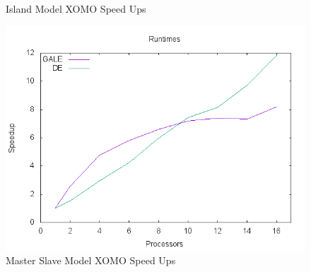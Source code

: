 \documentclass[conference]{IEEEtran}
\begin{document}
\begin{figure}[!htbp]
\begin{minipage}{0.5\linewidth}
\begin{mdframed}
	\end{mdframed}
	\caption{Island Model XOMO Speed Ups}	
	\label{fig:XOMO_island_speedups}
    \end{minipage}
    \begin{minipage}{0.5\linewidth}
    \centering
    \begin{mdframed}
		\includegraphics[width=\linewidth]{img/master-slave/xomo/speedups}
	\end{mdframed}
	\caption{Master Slave Model XOMO Speed Ups}	
	\label{fig:XOMO_master_speedups}
    \end{minipage}
    \end{figure}
    
	
	
\end{document}
